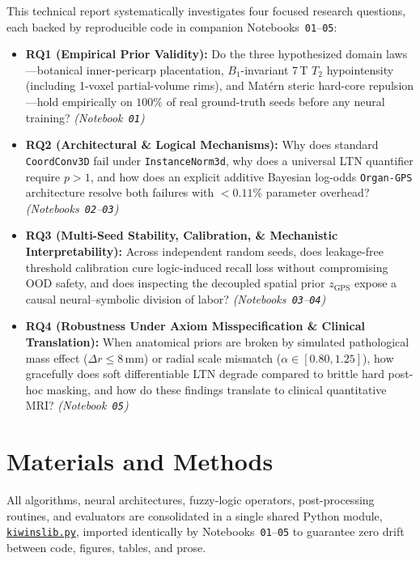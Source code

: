 \documentclass[10pt,a4paper]{article}
\renewcommand{\_}{\origunderscore\allowbreak}
\newcommand{\ghblob}{https://github.com/arvidl/BMED365-2027/blob/main}
\newcommand{\repodir}{Lab4-Comp-Imag/Kiwi-challenge/docs/neurosymbolic-report}
\newcommand{\nbref}[1]{\href{\ghblob/\repodir/notebooks/#1}{\texttt{#1}}}
\begin{document}
This technical report systematically investigates four focused research questions, each backed by reproducible code in companion Notebooks~\texttt{01}--\texttt{05}:
\begin{itemize}
    \item \textbf{RQ1 (Empirical Prior Validity):} Do the three hypothesized domain laws---botanical inner-pericarp placentation, $B_1$-invariant 7\,T $T_2$ hypointensity (including 1-voxel partial-volume rims), and Mat\'ern steric hard-core repulsion---hold empirically on $100\%$ of real ground-truth seeds before any neural training? \textit{(Notebook~\texttt{01})}
    \item \textbf{RQ2 (Architectural \& Logical Mechanisms):} Why does standard \texttt{CoordConv3D} fail under \texttt{InstanceNorm3d}, why does a universal LTN quantifier require $p > 1$, and how does an explicit additive Bayesian log-odds \texttt{Organ-GPS} architecture resolve both failures with $<0.11\%$ parameter overhead? \textit{(Notebooks~\texttt{02}--\texttt{03})}
    \item \textbf{RQ3 (Multi-Seed Stability, Calibration, \& Mechanistic Interpretability):} Across independent random seeds, does leakage-free threshold calibration cure logic-induced recall loss without compromising OOD safety, and does inspecting the decoupled spatial prior $z_{\text{GPS}}$ expose a causal neural--symbolic division of labor? \textit{(Notebooks~\texttt{03}--\texttt{04})}
    \item \textbf{RQ4 (Robustness Under Axiom Misspecification \& Clinical Translation):} When anatomical priors are broken by simulated pathological mass effect ($\Delta r \le 8\,\text{mm}$) or radial scale mismatch ($\alpha \in [0.80, 1.25]$), how gracefully does soft differentiable LTN degrade compared to brittle hard post-hoc masking, and how do these findings translate to clinical quantitative MRI? \textit{(Notebook~\texttt{05})}
\end{itemize}

\clearpage
\section{Materials and Methods}
\label{sec:methods}

All algorithms, neural architectures, fuzzy-logic operators, post-processing routines, and evaluators are consolidated in a single shared Python module, \nbref{kiwi\_ns\_lib.py}, imported identically by Notebooks~\texttt{01}--\texttt{05} to guarantee zero drift between code, figures, tables, and prose.
\end{document}
